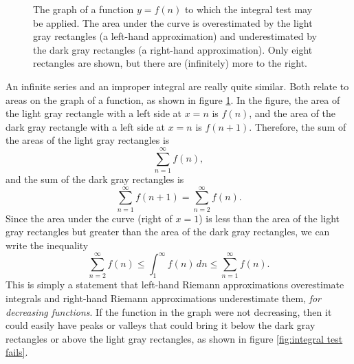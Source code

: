 \documentclass{myarticle}
\theoremstyle{nospace}
\newtheorem{old series theorem}{Theorem}
\newenvironment{series theorem}
{\begin{mdframed}\begin{old series theorem}}
    {\end{old series theorem}\end{mdframed}}
\begin{document}
\begin{figure}[htb!] \centering
  \caption{The graph of a function $y = f(n)$ to which the integral
    test may be applied. The area under the curve is overestimated by
    the light gray rectangles (a left-hand approximation) and
    underestimated by the dark gray rectangles (a right-hand
    approximation). Only eight rectangles are shown, but there are
    (infinitely) more to the right.}
  \label{fig:integral test}
\end{figure}

An infinite series and an improper integral are really quite similar.
Both relate to areas on the graph of a function, as shown in figure
\ref{fig:integral test}. In the figure, the area of the light gray
rectangle with a left side at $x = n$ is $f(n)$, and the area of the
dark gray rectangle with a left side at $x = n$ is $f(n + 1)$.
Therefore, the sum of the areas of the light gray rectangles is
\[
  \sum_{n=1}^\infty f(n),
\]
and the sum of the dark gray rectangles is
\[
  \sum_{n=1}^\infty f(n+1) = \sum_{n=2}^\infty f(n).
\]
Since the area under the curve (right of $x = 1$) is less than the
area of the light gray rectangles but greater than the area of the
dark gray rectangles, we can write the inequality
\[
  \sum_{n=2}^\infty f(n)
  \leq \int_1^\infty f(n) \,dn
  \leq \sum_{n=1}^\infty f(n).
\]
This is simply a statement that left-hand Riemann approximations
overestimate integrals and right-hand Riemann approximations
underestimate them, \emph{for decreasing functions}. If the function
in the graph were not decreasing, then it could easily have peaks or
valleys that could bring it below the dark gray rectangles or above
the light gray rectangles, as shown in figure \ref{fig:integral test
  fails}.
\end{document}
